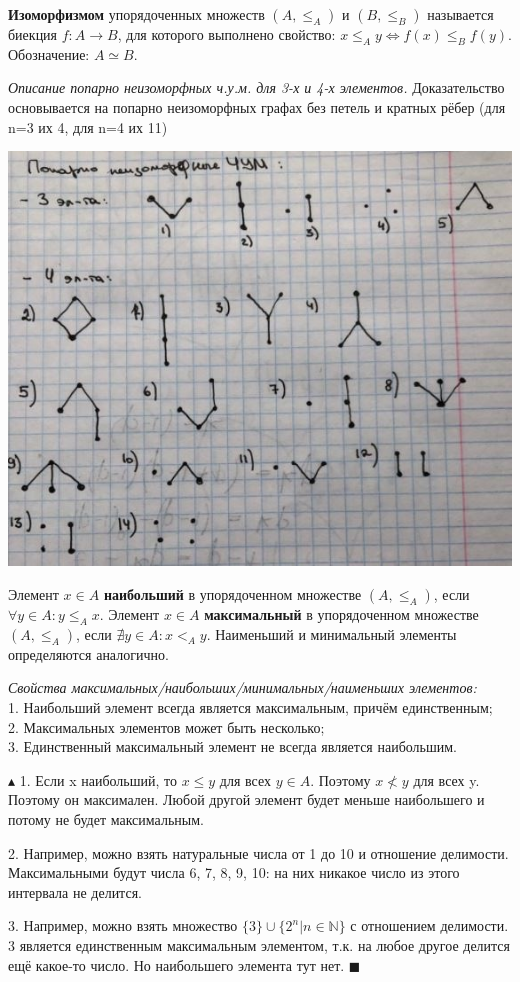 \textbf{Изоморфизмом} упорядоченных множеств $(A, \leqslant_A)$ и $(B, \leqslant_B)$ называется биекция $f: A \rightarrow B$, для которого выполнено свойство:  $x \leqslant_A y \Leftrightarrow f(x) \leqslant_B f(y)$. Обозначение: $A \simeq B$. \\ \par
\emph{Описание попарно неизоморфных ч.у.м. для 3-х и 4-х элементов.} Доказательство основывается на попарно неизоморфных графах без петель и кратных рёбер (для n=3 их 4, для n=4 их 11) \par
\includegraphics{images/19_pos} \\ \par

Элемент $x \in A$ \textbf{наибольший} в упорядоченном множестве $(A, \leqslant_A)$, если $\forall y \in A: y \leqslant_A x$. Элемент $x \in A$ \textbf{максимальный} в упорядоченном множестве $(A, \leqslant_A)$, если $\nexists y \in A : x <_A y$. Наименьший и минимальный элементы определяются аналогично. \\ \par

\emph{Свойства максимальных/наибольших/минимальных/наименьших элементов:} \\
1. Наибольший элемент всегда является максимальным, причём единственным; \\
2. Максимальных элементов может быть несколько; \\
3. Единственный максимальный элемент не всегда является наибольшим. \\ \par
$\blacktriangle$
1. Если x наибольший, то $x \leqslant y$ для всех $y \in A$. Поэтому $x \nless y$ для всех y. Поэтому он максимален. Любой другой элемент будет меньше наибольшего
и потому не будет максимальным. \par
2. Например, можно взять натуральные числа от 1 до 10 и отношение делимости.
Максимальными будут числа 6, 7, 8, 9, 10: на них никакое число из этого интервала
не делится. \par
3. Например, можно взять множество $\{ 3 \} \cup \{2^n | n \in \mathbb{N}\}$ с отношением делимости. 3 является единственным максимальным элементом, т.к. на любое другое делится ещё какое-то число. Но наибольшего элемента тут нет.
$\blacksquare$
